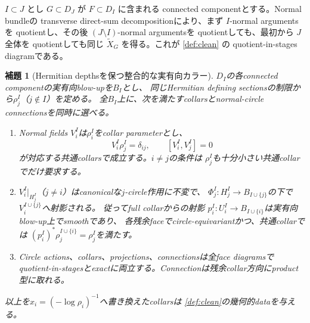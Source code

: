 \documentclass[11pt,a4paper]{ltjsarticle}
\theoremstyle{plain}
\newtheorem{lemma}[lemma]{補題}
\theoremstyle{definition}
\theoremstyle{remark}
\begin{document}
$I\subset J$ とし $G\subset D_J$ が $F\subset D_I$ に含まれる connected componentとする。Normal bundleの transverse direct-sum decompositionにより、まず $I$-normal argumentsを quotientし、その後 $(J\setminus I)$-normal argumentsを quotientしても、最初から $J$ 全体を quotientしても同じ $\widetilde X_G$ を得る。これが \cref{def:clean} の quotient-in-stages diagramである。

\begin{lemma}[Hermitian depthsを保つ整合的な実有向カラー]
\label{lem:SNC-compatible-collars}
$D_I$の各connected componentの実有向blow-upを$B_I$とし、
同じHermitian defining sectionsの制限から$\rho_j^I$（$j\notin I$）を定める。
全$B_I$上に、次を満たすcollarsとnormal-circle connectionsを同時に選べる。
\begin{enumerate}
\item Normal fields $V_i^I$は$\rho_i^I$をcollar parameterとし、
\[
 V_i^I\rho_j^I=\delta_{ij},\qquad [V_i^I,V_j^I]=0
\]
が対応する共通collarsで成立する。$i\ne j$の条件は
$\rho_j^I$も十分小さい共通collarでだけ要求する。
\item $V_i^I|_{H_j^I}$（$j\ne i$）はcanonicalな$j$-circle作用に不変で、
$\Phi_j^I:H_j^I\to B_{I\cup\{j\}}$の下で$V_i^{I\cup\{j\}}$へ射影される。
従ってfull collarからの射影
$p_i^I:U_i^I\to B_{I\cup\{i\}}$は実有向blow-up上でsmoothであり、
各残余faceでcircle-equivariantかつ、共通collarでは
$(p_i^I)^*\rho_j^{I\cup\{i\}}=\rho_j^I$を満たす。
\item Circle actions、collars、projections、connectionsは全face diagramsで
quotient-in-stagesとexactに両立する。Connectionは残余collar方向にproduct型に取れる。
\end{enumerate}
以上を$x_i=(-\log\rho_i)^{-1}$へ書き換えたcollarsは
\cref{def:clean}の幾何的dataを与える。
\end{lemma}
\end{document}
